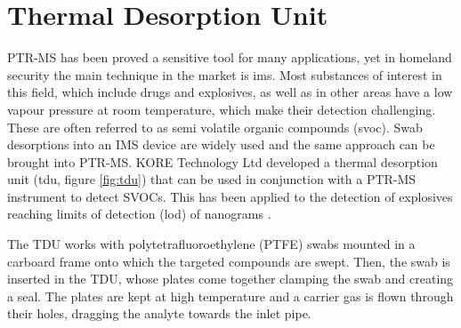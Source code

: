 \section{Thermal Desorption Unit}
PTR-MS has been proved a sensitive tool for many applications, yet in homeland security the main technique in the market is \acrshort{ims}. Most substances of interest in this field, which include drugs and explosives, as well as in other areas have a low vapour pressure at room temperature, which make their detection challenging. These are often referred to as semi volatile organic compounds (\acrshort{svoc}). Swab desorptions into an IMS device are widely used and the same approach can be brought into PTR-MS. KORE Technology Ltd developed a thermal desorption unit (\acrshort{tdu}, figure \ref{fig:tdu}) that can be used in conjunction with a PTR-MS instrument to detect SVOCs. This has been applied to the detection of explosives reaching limits of detection (\acrshort{lod}) of nanograms \cite{RN445}.

The TDU works with polytetrafluoroethylene (PTFE) swabs mounted in a carboard frame onto which the targeted compounds are swept. Then, the swab is inserted in the TDU, whose plates come together clamping the swab and creating a seal. The plates are kept at high temperature and a carrier gas is flown through their holes, dragging the analyte towards the inlet pipe. 


